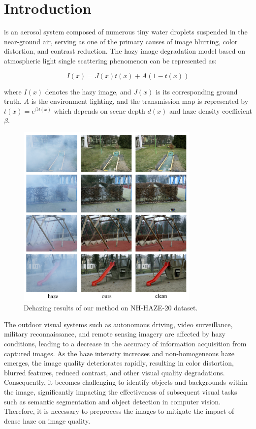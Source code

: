 \documentclass[lettersize,journal]{IEEEtran}
\begin{document}
\section{Introduction}
 is an aerosol system composed of numerous tiny water droplets suspended in the near-ground air, serving as one of the primary causes of image blurring, color distortion, and contrast reduction. The hazy image degradation model based on atmospheric light single scattering phenomenon\cite{mccartney1976optics} \cite{narasimhan2002vision} can be represented as:

\begin{equation}
	\label{scattering_model}
	I(x) = J(x)t(x) + A(1 - t(x))
\end{equation}

\noindent where $I(x)$ denotes the hazy image, and $J(x)$ is its corresponding ground truth. $A$ is the environment lighting, and the transmission map is represented by $t(x) = e^{\beta d(x)}$ which depends on scene depth $d(x)$ and haze density coefficient $\beta$. 

\begin{figure}[!t]
	\centering
	\includegraphics[width=3.5in]{result_nh_haze_20}
	\caption{Dehazing results of our method on NH-HAZE-20 dataset.}
	\label{fig}
\end{figure}


The outdoor visual systems such as autonomous driving, video surveillance, military reconnaissance, and remote sensing imagery are affected by hazy conditions, leading to a decrease in the accuracy of information acquisition from captured images. As the haze intensity increases and non-homogeneous haze emerges, the image quality deteriorates rapidly, resulting in color distortion, blurred features, reduced contrast, and other visual quality degradations. Consequently, it becomes challenging to identify objects and backgrounds within the image, significantly impacting the effectiveness of subsequent visual tasks such as semantic segmentation and object detection in computer vision. Therefore, it is necessary to preprocess the images to mitigate the impact of dense haze on image quality.
\end{document}
